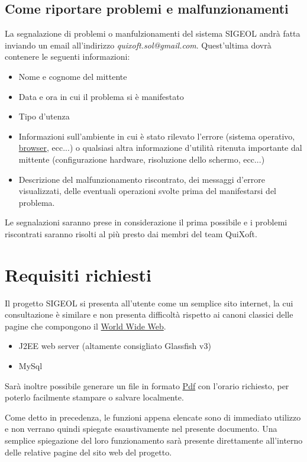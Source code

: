 \documentclass[11pt,a4paper]{article}
\begin{document}
\subsection{Come riportare problemi e malfunzionamenti}
La segnalazione di problemi o manfulzionamenti del sistema SIGEOL andrà fatta inviando un email all'indirizzo \textit{quixoft.sol@gmail.com}.
Quest'ultima dovrà contenere le seguenti informazioni:
\begin{itemize}
 \item Nome e cognome del mittente
 \item Data e ora in cui il problema si è manifestato
 \item Tipo d'utenza
 \item Informazioni sull'ambiente in cui è stato rilevato l'errore (sistema operativo, \underline{browser}, ecc...) o qualsiasi altra informazione d'utilità ritenuta importante dal mittente (configurazione hardware, risoluzione dello schermo, ecc...)
 \item Descrizione del malfunzionamento riscontrato, dei messaggi d'errore visualizzati, delle eventuali operazioni svolte prima del manifestarsi del problema.
\end{itemize}
Le segnalazioni saranno prese in considerazione il prima possibile e i problemi riscontrati saranno risolti al più presto dai membri del team QuiXoft.
\section{Requisiti richiesti}
Il progetto SIGEOL si presenta all'utente come un semplice sito internet, la cui consultazione è similare e non presenta difficoltà rispetto ai canoni classici delle pagine che compongono il \underline{World Wide Web}.

\begin{itemize}
 \item J2EE web server (altamente consigliato Glassfish v3)
 \item MySql
\end{itemize}
Sarà inoltre possibile generare un file in formato \underline{Pdf} con l'orario richiesto, per poterlo facilmente stampare o salvare localmente.

Come detto in precedenza, le funzioni appena elencate sono di immediato utilizzo e non verrano quindi spiegate esaustivamente nel presente documento.
Una semplice spiegazione del loro funzionamento sarà presente direttamente all'interno delle relative pagine del sito web del progetto.
\end{document}
